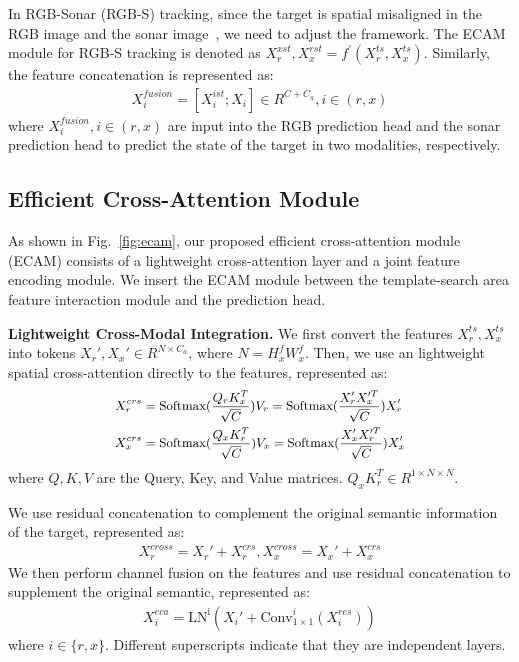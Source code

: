 In RGB-Sonar (RGB-S) tracking, since the target is spatial misaligned in the RGB image and the sonar image~\cite{rgbs50}, we need to adjust the framework. The ECAM module for RGB-S tracking is denoted as $X_{r}^{xst}, X_{x}^{rst}=f^{'}(X_{r}^{ts}, X_{x}^{ts})$. Similarly, the feature concatenation is represented as:
\begin{equation}
\begin{split}
X_{i}^{fusion}=[X_{i}^{ist}; X_{i}] \in R^{C+C_{a}}, i\in(r,x)
\end{split}
\end{equation}
where $X_{i}^{fusion}, i\in(r,x)$ are input into the RGB prediction head and the sonar prediction head to predict the state of the target in two modalities, respectively.


\subsection{Efficient Cross-Attention Module}

As shown in Fig.~\ref{fig:ecam}, our proposed efficient cross-attention module (ECAM) consists of a lightweight cross-attention layer and a joint feature encoding module. We insert the ECAM module between the template-search area feature interaction module and the prediction head.



\textbf{Lightweight Cross-Modal Integration.} 
We first convert the features $X_{r}^{ts}, X_{x}^{ts}$ into tokens $X_{r}', X_{x}'\in R^{N\times C_{a}}$, where $N=H_{x}^{f}W_{x}^{f}$. Then, we use an lightweight spatial cross-attention directly to the features, represented as:
\begin{equation}\small
\begin{split}
X_{r}^{crs} &=\text{Softmax}(\frac{Q_{r}K_{x}^{T}}{\sqrt{C}})V_{r}=\text{Softmax}(\frac{X_{r}'X_{x}'^{T}}{\sqrt{C}})X_{r}' \\
X_{x}^{crs} &=\text{Softmax}(\frac{Q_{x}K_{r}^{T}}{\sqrt{C}})V_{x}=\text{Softmax}(\frac{X_{x}'X_{r}'^{T}}{\sqrt{C}})X_{x}'
\end{split}
\end{equation}
where $Q, K, V$ are the Query, Key, and Value matrices. $Q_{x}K_{r}^{T}\in R^{1\times N\times N}$.

We use residual concatenation to complement the original semantic information of the target, represented as:
\begin{equation}
\begin{split}
X_{r}^{cross} = X_{r}'+X_{r}^{crs}, X_{x}^{cross} = X_{x}'+X_{x}^{crs}
\end{split}
\end{equation}
We then perform channel fusion on the features and use residual concatenation to supplement the original semantic, represented as:
\begin{equation}
\begin{split}
X_{i}^{eca} = \text{LN}^{\text{i}} (X_{i}'+\text{Conv}_{1\times 1}^{i}({X_{i}^{res}})) 
\end{split}
\end{equation}
where $i\in\{r,x\}$. Different superscripts indicate that they are independent layers.


